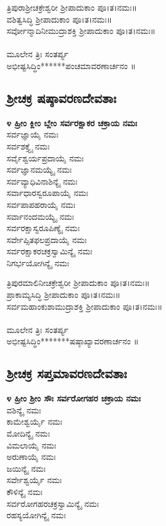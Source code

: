  ತ್ರಿಪುರಾಶ್ರೀಚಕ್ರೇಶ್ವರೀ ಶ್ರೀಪಾದುಕಾಂ ಪೂ।ತ।ನಮಃ॥\\
 ವಶಿತ್ವಸಿದ್ಧಿ ಶ್ರೀಪಾದುಕಾಂ ಪೂ।ತ।ನಮಃ॥\\
ಸರ್ವೋನ್ಮಾದಿನೀಮುದ್ರಾಶಕ್ತಿ ಶ್ರೀಪಾದುಕಾಂ ಪೂ।ತ।ನಮಃ॥\\
\\
ಮೂಲೇನ ತ್ರಿಃ ಸಂತರ್ಪ್ಯ\\
 ಅಭೀಷ್ಟಸಿದ್ಧಿಂ******ಪಂಚಮಾವರಣಾರ್ಚನಂ ॥
\subsection{ಶ್ರೀಚಕ್ರ ಷಷ್ಠಾವರಣದೇವತಾಃ}
{\bfseries ೪ ಹ್ರೀಂ ಕ್ಲೀಂ ಬ್ಲೇಂ ಸರ್ವರಕ್ಷಾಕರ ಚಕ್ರಾಯ ನಮಃ}\\
 ಸರ್ವಜ್ಞಾಯೈ ನಮಃ\\
 ಸರ್ವಶಕ್ತ್ಯೈ ನಮಃ\\
 ಸರ್ವೈಶ್ವರ್ಯಪ್ರದಾಯೈ ನಮಃ\\
 ಸರ್ವಜ್ಞಾನಮಯ್ಯೈ ನಮಃ\\
 ಸರ್ವವ್ಯಾಧಿವಿನಾಶಿನ್ಯೈ ನಮಃ\\
 ಸರ್ವಾಧಾರಸ್ವರೂಪಾಯೈ ನಮಃ\\
 ಸರ್ವಪಾಪಹರಾಯೈ ನಮಃ\\
 ಸರ್ವಾನಂದಮಯ್ಯೈ ನಮಃ\\
 ಸರ್ವರಕ್ಷಾಸ್ವರೂಪಿಣ್ಯೈ ನಮಃ\\
 ಸರ್ವೇಪ್ಸಿತಫಲಪ್ರದಾಯೈ ನಮಃ\\
 ಸರ್ವರಕ್ಷಾಕರಚಕ್ರಸ್ವಾಮಿನ್ಯೈ ನಮಃ\\
ನಿಗರ್ಭಯೋಗಿನ್ಯೈ ನಮಃ

 ತ್ರಿಪುರಮಾಲಿನೀಚಕ್ರೇಶ್ವರೀ ಶ್ರೀಪಾದುಕಾಂ ಪೂ।ತ।ನಮಃ॥\\
 ಪ್ರಾಕಾಮ್ಯಸಿದ್ಧಿ ಶ್ರೀಪಾದುಕಾಂ ಪೂ।ತ।ನಮಃ॥\\
 ಸರ್ವಮಹಾಂಕುಶಾಮುದ್ರಾಶಕ್ತಿ ಶ್ರೀಪಾದುಕಾಂ ಪೂ।ತ।ನಮಃ॥\\
\\
ಮೂಲೇನ ತ್ರಿಃ ಸಂತರ್ಪ್ಯ\\
 ಅಭೀಷ್ಟಸಿದ್ಧಿಂ*******ಷಷ್ಠಾಖ್ಯಾವರಣಾರ್ಚನಂ ॥
\subsection{ಶ್ರೀಚಕ್ರ ಸಪ್ತಮಾವರಣದೇವತಾಃ}
{\bfseries ೪ ಹ್ರೀಂ ಶ್ರೀಂ ಸೌಃ ಸರ್ವರೋಗಹರ ಚಕ್ರಾಯ ನಮಃ}\\
 ವಶಿನ್ಯೈ ನಮಃ\\
 ಕಾಮೇಶ್ವರ್ಯೈ ನಮಃ\\
 ಮೋದಿನ್ಯೈ ನಮಃ\\
 ವಿಮಲಾಯೈ ನಮಃ\\
 ಅರುಣಾಯೈ ನಮಃ\\
 ಜಯಿನ್ಯೈ ನಮಃ\\
 ಸರ್ವೇಶ್ವರ್ಯೈ ನಮಃ\\
 ಕೌಳಿನ್ಯೈ ನಮಃ\\
 ಸರ್ವರೋಗಹರಚಕ್ರಸ್ವಾಮಿನ್ಯೈ ನಮಃ\\
ರಹಸ್ಯಯೋಗಿನ್ಯೈ ನಮಃ


